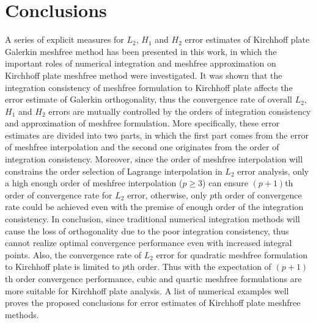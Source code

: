 \section{Conclusions}\label{sec:conclusion}

A series of explicit measures for $L_2$, $H_1$ and $H_2$ error estimates of Kirchhoff plate Galerkin meshfree method has been presented in this work, in which the important roles of numerical integration and meshfree approximation on Kirchhoff plate meshfree method were investigated.
It was shown that the integration consistency of meshfree formulation to Kirchhoff plate affects the error estimate of Galerkin orthogonality, thus the convergence rate of overall $L_2$, $H_1$ and $H_2$ errors are mutually controlled by the orders of integration consistency and approximation of meshfree formulation.
More specifically, these error estimates are divided into two parts, in which the first part comes from the error of meshfree interpolation and the second one originates from the order of integration consistency.
Moreover, since the order of meshfree interpolation will constrains the order selection of Lagrange interpolation in $L_2$ error analysis, only a high enough order of meshfree interpolation ($p\ge3$) can ensure $(p+1)$th order of convergence rate for $L_2$ error, otherwise, only $p$th order of convergence rate could be achieved even with the premise of enough order of the integration consistency.
In conclusion, since traditional numerical integration methods will cause the loss of orthogonality due to the poor integration consistency, thus cannot realize optimal convergence performance even with increased integral points.
Also, the convergence rate of $L_2$ error for quadratic meshfree formulation to Kirchhoff plate is limited to $p$th order.
Thus with the expectation of $(p+1)$th order convergence performance, cubic and quartic meshfree formulations are more suitable for Kirchhoff plate analysis.
A list of numerical examples well proves the proposed conclusions for error estimates of Kirchhoff plate meshfree methods.
